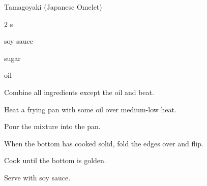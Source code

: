 \begin{recipe}{Tamagoyaki (Japanese Omelet)}{}{}

\begin{description}
\item 2 s
\item {} soy sauce
\item {} sugar
\item oil
\end{description}

\begin{directions}
\item Combine all ingredients except the oil and beat.
\item Heat a frying pan with some oil over medium-low heat.
\item Pour the mixture into the pan.
\item When the bottom has cooked solid, fold the edges over and flip.
\item Cook until the bottom is golden.
\item Serve with soy sauce.
\end{directions}

\end{recipe}
